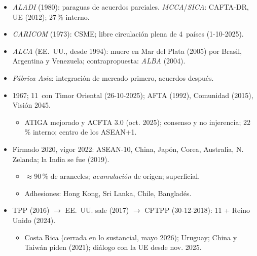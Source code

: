\documentclass{article}
\begin{document}
\begin{columnas}
\begin{itemize}
\item \emph{ALADI} (1980): paraguas de acuerdos parciales. \emph{MCCA}/\emph{SICA}: CAFTA-DR, UE (2012); 27\,\% interno.
\item \emph{CARICOM} (1973): CSME; libre circulación plena de 4~países (1-10-2025).
\item \emph{ALCA} (EE.~UU., desde 1994): muere en Mar del Plata (2005) por Brasil, Argentina y Venezuela; contrapropuesta: \emph{ALBA} (2004).
\end{itemize}

\begin{itemize}
\item \emph{Fábrica Asia}: integración de mercado primero, acuerdos después.
\end{itemize}
\begin{itemize}
\item 1967; 11~con Timor Oriental (26-10-2025); AFTA (1992), Comunidad (2015), Visión 2045.
  \begin{itemize}
  \item ATIGA mejorado y ACFTA 3.0 (oct. 2025); consenso y no injerencia; 22\,\% interno; centro de los ASEAN+1.
  \end{itemize}
\end{itemize}
\begin{itemize}
\item Firmado 2020, vigor 2022: ASEAN-10, China, Japón, Corea, Australia, N. Zelanda; la India se fue (2019).
  \begin{itemize}
  \item $\approx$90\,\% de aranceles; \emph{acumulación} de origen; superficial.
  \item Adhesiones: Hong Kong, Sri Lanka, Chile, Bangladés.
  \end{itemize}
\end{itemize}
\begin{itemize}
\item TPP (2016) $\to$ EE.~UU. sale (2017) $\to$ CPTPP (30-12-2018): 11 + Reino Unido (2024).
  \begin{itemize}
  \item Costa Rica (cerrada en lo sustancial, mayo 2026); Uruguay; China y Taiwán piden (2021); diálogo con la UE desde nov. 2025.

\end{itemize}
\end{itemize}
\end{columnas}
\end{document}
